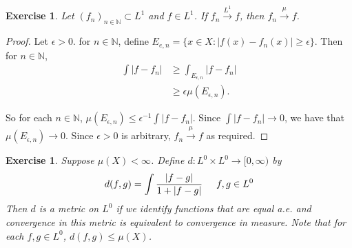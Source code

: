\documentclass[12pt]{amsart}
\newtheorem{ex}[thm]{Exercise}
\newcommand{\ep}{\epsilon}
\newcommand{\N}{\mathbb{N}}
\newcommand{\Rg}{[0,\infty)}
\newcommand{\conv}[1]{\xrightarrow{#1}}
\begin{document}
	\begin{ex}
		Let $(f_n)_{n \in \N} \subset L^1$ and $f \in L^1$. If $f_n \xrightarrow{L^1}f$, then $f_n \conv{\mu} f$.
	\end{ex}
	
	\begin{proof}
		Let $\ep >0$. for $n \in \N$, define $E_{e,n} = \{x \in X: |f(x) - f_n(x)|\geq \ep\}$. Then for $n \in \N$,
		\begin{align*}
			\int |f - f_n|
			& \geq \int_{E_{\ep,n}} |f- f_n|\\
			& \geq \ep \mu(E_{\ep,n}).
		\end{align*}
		
		So for each $n \in \N$, $\mu(E_{\ep, n}) \leq \ep^{-1}\int |f - f_n|$. Since $\int |f - f_n| \conv{} 0$, we have that $\mu(E_{\ep,n}) \conv{} 0$. Since $\ep >0$ is arbitrary, $f_n \conv{\mu} f$ as required. 
	\end{proof}
	
	\begin{ex}
		Suppose $\mu(X) < \infty$. Define $d:L^0 \times L^0 \rightarrow \Rg$ by $$d(f,g) = \int \frac{|f-g|}{1+|f-g|} \hspace{5mm} f,g \in L^0$$
		Then $d$ is a metric on $L^0$ if we identify functions that are equal a.e. and convergence in this metric is equivalent to convergence in measure. Note that for each $f,g \in L^0$, $d(f,g) \leq \mu(X)$.
	\end{ex} 
	
\end{document}
